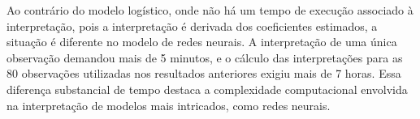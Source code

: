 Ao contrário do modelo logístico, onde não há um tempo de execução associado à interpretação, 
pois a interpretação é derivada dos coeficientes estimados, a situação é diferente no modelo de redes neurais. 
A interpretação de uma única observação demandou mais de 5 minutos, e o cálculo das interpretações para as 80
observações utilizadas nos resultados anteriores exigiu mais de 7 horas. Essa diferença substancial de tempo
destaca a complexidade computacional envolvida na interpretação de modelos mais intricados, como redes neurais.

